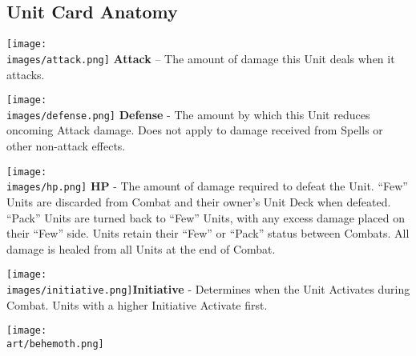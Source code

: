 \begin{multicols}{2}
\subsection*{Unit Card Anatomy}

\vspace{0pt}

\texttt{[image: \\images/attack.png]} \textbf{Attack} – The amount of damage this Unit deals when it attacks.\par
\texttt{[image: \\images/defense.png]} \textbf{Defense} - The amount by which this Unit reduces oncoming Attack damage.
Does not apply to damage received from Spells or other non-attack effects.\par
\texttt{[image: \\images/hp.png]} \textbf{\hypertarget{HP}{HP}} - The amount of damage required to defeat the Unit.
``Few'' Units are discarded from Combat and their owner's Unit Deck when defeated.
``Pack'' Units are turned back to ``Few'' Units, with any excess damage placed on their ``Few'' side.
Units retain their ``Few'' or ``Pack'' status between Combats.
All damage is healed from all Units at the end of Combat.\par
\texttt{[image: \\images/initiative.png]}{\hypertarget{Initiative}{\textbf{Initiative}}} - Determines when the Unit Activates during Combat.
Units with a higher Initiative Activate first.

\vfill
\hspace{-2em}
\texttt{[image: \\art/behemoth.png]}


\end{multicols}
